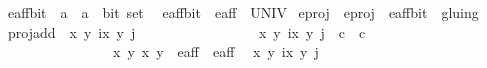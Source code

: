 \begin{isabellebody}
\ e{\isacharprime}{\isacharunderscore}aff{\isacharunderscore}bit\ {\isacharcolon}{\isacharcolon}\ {\isachardoublequoteopen}{\isacharparenleft}{\isacharparenleft}{\isacharprime}a\ {\isasymtimes}\ {\isacharprime}a{\isacharparenright}\ {\isasymtimes}\ bit{\isacharparenright}\ set{\isachardoublequoteclose}\ \isanewline
\ {\isachardoublequoteopen}e{\isacharprime}{\isacharunderscore}aff{\isacharunderscore}bit\ {\isacharequal}\ e{\isacharprime}{\isacharunderscore}aff\ {\isasymtimes}\ UNIV{\isachardoublequoteclose}\isanewline
\isanewline
\isanewline
{}\isamarkupfalse%
\ e{\isacharunderscore}proj\ \ {\isachardoublequoteopen}e{\isacharunderscore}proj\ {\isacharequal}\ e{\isacharprime}{\isacharunderscore}aff{\isacharunderscore}bit\ {\isacharslash}{\isacharslash}\ gluing{\isachardoublequoteclose}\isanewline
\isanewline
\isanewline
{}\isamarkupfalse%
\ {\isachardoublequoteopen}proj{\isacharunderscore}add\ {\isacharbackquote}\ {\isacharbraceleft}{\isacharparenleft}{\isacharparenleft}{\isacharparenleft}x\ y\ i{\isacharparenright}{\isacharcomma}{\isacharparenleft}{\isacharparenleft}x\ y\ j{\isacharparenright}{\isacharparenright}{\isachardot}\ \isanewline
\ \ \ \ \ \ \ \ \ \ \ \ \ \ \ \ {\isacharparenleft}{\isacharparenleft}{\isacharparenleft}x\ y\ i{\isacharparenright}{\isacharcomma}{\isacharparenleft}{\isacharparenleft}x\ y\ j{\isacharparenright}{\isacharparenright}\ {\isasymin}\ c\ {\isasymtimes}\ c\ {\isasymand}\ \isanewline
\ \ \ \ \ \ \ \ \ \ \ \ \ \ \ \ {\isacharparenleft}{\isacharparenleft}x\ y\ {\isacharparenleft}x\ y\ {\isasymin}\ e{\isacharprime}{\isacharunderscore}aff{\isacharunderscore}{}\ {\isasymunion}\ e{\isacharprime}{\isacharunderscore}aff{\isacharunderscore}{}{\isacharbraceright}\ {\isachardoublequoteclose}\isanewline
\isanewline
\isanewline
\isanewline
{}\isamarkupfalse%
\ {\isachardoublequoteopen}{\isacharbraceleft}{\isacharparenleft}{\isacharparenleft}{\isacharparenleft}x\ y\ i{\isacharparenright}{\isacharcomma}{\isacharparenleft}{\isacharparenleft}x\ y\ j{\isacharparenright}{\isacharparenright}{\isachardot}\ \isanewline

\end{isabellebody}

